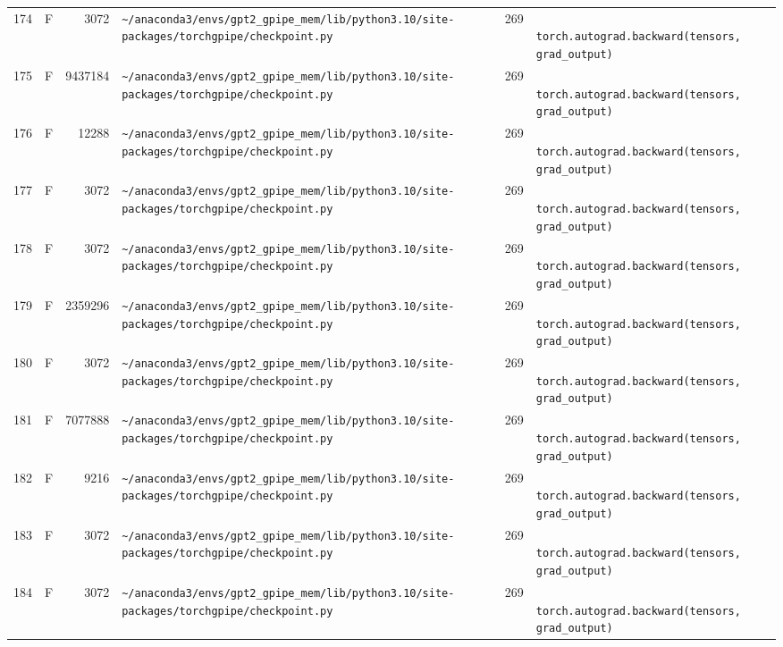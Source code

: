 \documentclass{article}
\begin{document}
\begin{longtable}{r l r p{6.5cm} r p{7.0cm}}
174 & F & 3072 & \lstinline|~/anaconda3/envs/gpt2_gpipe_mem/lib/python3.10/site-packages/torchgpipe/checkpoint.py| & 269 & \lstinline|            torch.autograd.backward(tensors, grad_output)| \\
175 & F & 9437184 & \lstinline|~/anaconda3/envs/gpt2_gpipe_mem/lib/python3.10/site-packages/torchgpipe/checkpoint.py| & 269 & \lstinline|            torch.autograd.backward(tensors, grad_output)| \\
176 & F & 12288 & \lstinline|~/anaconda3/envs/gpt2_gpipe_mem/lib/python3.10/site-packages/torchgpipe/checkpoint.py| & 269 & \lstinline|            torch.autograd.backward(tensors, grad_output)| \\
177 & F & 3072 & \lstinline|~/anaconda3/envs/gpt2_gpipe_mem/lib/python3.10/site-packages/torchgpipe/checkpoint.py| & 269 & \lstinline|            torch.autograd.backward(tensors, grad_output)| \\
178 & F & 3072 & \lstinline|~/anaconda3/envs/gpt2_gpipe_mem/lib/python3.10/site-packages/torchgpipe/checkpoint.py| & 269 & \lstinline|            torch.autograd.backward(tensors, grad_output)| \\
179 & F & 2359296 & \lstinline|~/anaconda3/envs/gpt2_gpipe_mem/lib/python3.10/site-packages/torchgpipe/checkpoint.py| & 269 & \lstinline|            torch.autograd.backward(tensors, grad_output)| \\
180 & F & 3072 & \lstinline|~/anaconda3/envs/gpt2_gpipe_mem/lib/python3.10/site-packages/torchgpipe/checkpoint.py| & 269 & \lstinline|            torch.autograd.backward(tensors, grad_output)| \\
181 & F & 7077888 & \lstinline|~/anaconda3/envs/gpt2_gpipe_mem/lib/python3.10/site-packages/torchgpipe/checkpoint.py| & 269 & \lstinline|            torch.autograd.backward(tensors, grad_output)| \\
182 & F & 9216 & \lstinline|~/anaconda3/envs/gpt2_gpipe_mem/lib/python3.10/site-packages/torchgpipe/checkpoint.py| & 269 & \lstinline|            torch.autograd.backward(tensors, grad_output)| \\
183 & F & 3072 & \lstinline|~/anaconda3/envs/gpt2_gpipe_mem/lib/python3.10/site-packages/torchgpipe/checkpoint.py| & 269 & \lstinline|            torch.autograd.backward(tensors, grad_output)| \\
184 & F & 3072 & \lstinline|~/anaconda3/envs/gpt2_gpipe_mem/lib/python3.10/site-packages/torchgpipe/checkpoint.py| & 269 & \lstinline|            torch.autograd.backward(tensors, grad_output)| \\

\end{longtable}
\end{document}
